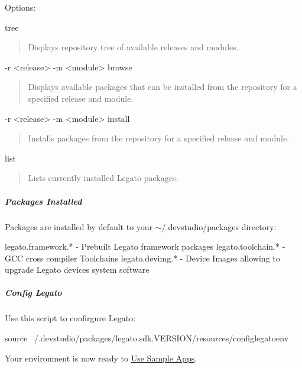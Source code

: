 Options\+:

\begin{DoxyVerb}tree \end{DoxyVerb}
 \begin{quote}
Displays repository tree of available releases and modules. \end{quote}


\begin{DoxyVerb}-r <release> -m <module> browse\end{DoxyVerb}
 \begin{quote}
Displays available packages that can be installed from the repository for a specified release and module. \end{quote}


\begin{DoxyVerb}-r <release> -m <module> install\end{DoxyVerb}
 \begin{quote}
Installs packages from the repository for a specified release and module. \end{quote}


\begin{DoxyVerb}list\end{DoxyVerb}
 \begin{quote}
Lists currently installed Legato packages. \end{quote}
\hypertarget{getstarted_d_sspm_getstartedDSspm_useSPMpkgs}{}\subparagraph{Packages Installed}\label{getstarted_d_sspm_getstartedDSspm_useSPMpkgs}
Packages are installed by default to your {\ttfamily $\sim$/}.devstudio/packages directory\+: \begin{DoxyVerb}legato.framework.* - Prebuilt Legato framework packages
legato.toolchain.* - GCC cross compiler Toolchains
legato.devimg.* - Device Images allowing to upgrade Legato devices system software
\end{DoxyVerb}
\hypertarget{getstarted_d_sspm_getstartedDSspm_useSPMconfig}{}\subparagraph{Config Legato}\label{getstarted_d_sspm_getstartedDSspm_useSPMconfig}
Use this script to confirgure Legato\+:

\begin{DoxyVerb}source ~/.devstudio/packages/legato.sdk.VERSION/resources/configlegatoenv
\end{DoxyVerb}


Your environment is now ready to \hyperlink{getstartedSampleApps}{Use Sample Apps}. ~\newline






